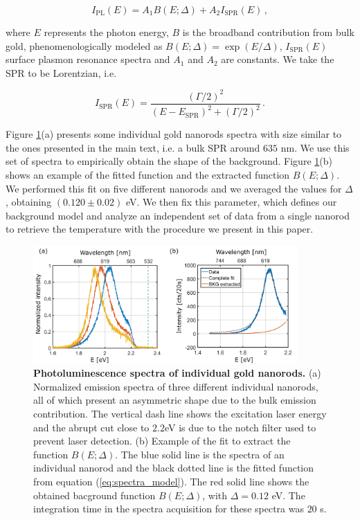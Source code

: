 \documentclass[journal=nalefd,manuscript=letter]{achemso}
\begin{document}
\begin{equation}
I_{\textrm{PL}}(E) = A_1 B(E;\Delta) + A_2 I_\textrm{SPR}(E)\,,
\label{eq:spectra_model}
\end{equation}

where $E$ represents the photon energy, $B$ is the broadband contribution from bulk gold, 
phenomenologically modeled as $B(E;\Delta) = \exp(E/\Delta)$, $I_\textrm{SPR}(E)$ surface 
plasmon resonance spectra and $A_1$ and $A_2$ are constants. 
We take the SPR to be Lorentzian\cite{Zijlstra2011}, i.e.  

\begin{equation}
I_{\textrm{SPR}}(E) = \frac{\left( \Gamma/2 \right)^2}{\left( E-E_\textrm{SPR}\right)^2 +\left( \Gamma/2 \right)^2}\,.
\label{eq:ISPR}
\end{equation}

Figure \ref{fig:PL_spectra}(a) presents some individual gold nanorods spectra with 
size similar to the ones presented in the main text, i.e. a bulk SPR around $635$ nm. 
We use this set of spectra to empirically obtain the shape of the background.
Figure \ref{fig:PL_spectra}(b) shows an example of the fitted function and the extracted 
function $B(E;\Delta)$. We performed this fit on five different nanorods and we averaged 
the values for $\Delta$, obtaining $(0.120\pm0.02)$ eV.
We then fix this parameter, which defines our background model and analyze an independent 
set of data from a single nanorod to retrieve the temperature with the procedure we 
present in this paper.


\begin{figure}[htp] \centering
\includegraphics[width=0.90\textwidth]{Figures/Supplementary/09_Error_vs_Wavelength/532nm_spectra_and_bkg.png}
\caption{\textbf{Photoluminescence spectra of individual gold nanorods.} 
(a) Normalized emission spectra of three different individual nanorods, all of which present 
an asymmetric shape due to the bulk emission contribution. The vertical dash line shows the 
excitation laser energy and the abrupt cut close to $2.2$eV is due to the notch filter used 
to prevent laser detection. (b) Example of the fit to extract the function $B(E;\Delta)$. 
The blue solid line is the spectra of an individual nanorod and the black dotted line is the 
fitted function from equation (\ref{eq:spectra_model}). The red solid line shows the obtained bacground 
function $B(E;\Delta)$, with $\Delta = 0.12$ eV. 
The integration time in the spectra acquisition for these spectra was $20$ s.}
\label{fig:PL_spectra}
\end{figure}
\end{document}
